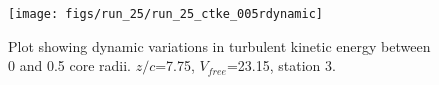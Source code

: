 \begin{figure}[H]
\centering
\texttt{[image: figs/run\_25/run\_25\_ctke\_005rdynamic]}
\caption{Plot showing dynamic variations in turbulent kinetic energy between 0 and 0.5 core radii. $z/c$=7.75, $V_{free}$=23.15, station 3.}
\label{fig:run_25_ctke_005rdynamic}
\end{figure}


